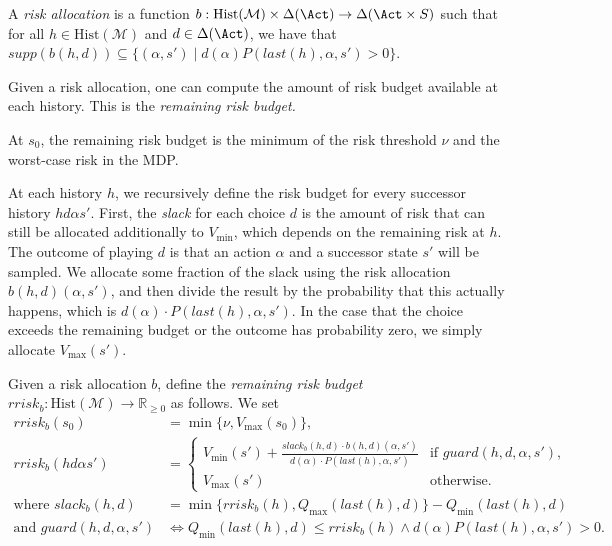 \documentclass[runningheads]{llncs}
\newcommand{\M}{\mathcal{M}}
\newcommand{\Distr}{\Delta}
\newcommand{\Hist}{\mathrm{Hist}}
\newcommand{\slack}{\mathit{slack}}
\newcommand{\guard}{\mathit{guard}}
\newcommand{\rrisk}{\mathit{rrisk}}
\newcommand{\last}{\mathit{last}}
\newcommand{\supp}{\mathit{supp}}
\begin{document}
\begin{definition}
    A \emph{risk allocation} is a function \(b : \Hist(\M) \times \Distr(\Act) \rightarrow \Distr(\Act \times S)\) such that for all \(h \in \Hist(\M)\) and \(d \in \Distr(\Act)\), we have that \(\supp(b(h,d)) \subseteq \{(\alpha, s') \mid d(\alpha) P(\last(h),\alpha,s') > 0\}\).
\end{definition}

Given a risk allocation, one can compute the amount of risk budget available at each history. This is the \emph{remaining risk budget.}

At \(s_0\), the remaining risk budget is the minimum of the risk threshold \(\nu\) and the worst-case risk in the MDP.

At each history \(h\), we recursively define the risk budget for every successor history \(h d \alpha s'\). First, the \emph{slack} for each choice \(d\) is the amount of risk that can still be allocated additionally to \(V_{\min}\), which depends on the remaining risk at \(h\). The outcome of playing \(d\) is that an action \(\alpha\) and a successor state \(s'\) will be sampled. We allocate some fraction of the slack using the risk allocation \(b(h,d)(\alpha,s')\), and then divide the result by the probability that this actually happens, which is \(d(\alpha) \cdot P(\last(h), \alpha, s')\). In the case that the choice exceeds the remaining budget or the outcome has probability zero, we simply allocate \(V_{\max}(s')\).

\begin{definition}
    \label{def:remainingrisk}
    Given a risk allocation \(b\), define the \emph{remaining risk budget} \(\rrisk_b: \Hist(\M) \rightarrow \mathbb{R}_{\geq 0}\) as follows. We set
    \begin{align*}
        \rrisk_b(s_0) &= \min \{ \nu, V_{\max}(s_0) \}, \\
        \rrisk_b(h d \alpha s') &=
        \begin{cases}
            V_{\min}(s') + \frac{\slack_b(h, d) \cdot b(h,d)(\alpha,s')}{d(\alpha) \cdot P(\last(h),\alpha,s')} &\text{if } \guard(h,d,\alpha,s'), \\
            V_{\max}(s') &\text{otherwise.}
        \end{cases} \\
        \text{where } \slack_b(h, d) &=  \min\{\rrisk_b(h), Q_{\max}(\last(h),d)\} - Q_{\min}(\last(h),d) \\
        \text{and } \guard(h,d,\alpha,s') &\Leftrightarrow Q_{\min}(\last(h),d) \leq \rrisk_b(h) \land d(\alpha)P(\last(h),\alpha,s') > 0.
    \end{align*}
\end{definition}
\end{document}

